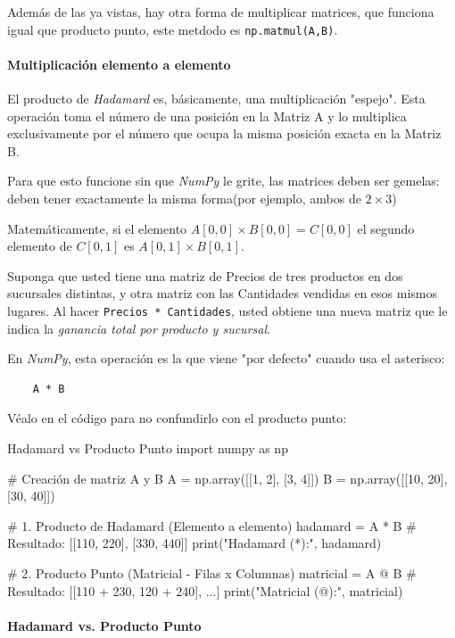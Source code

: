 Además de las ya vistas, hay otra forma de multiplicar matrices, que funciona igual que producto punto, este metdodo es \texttt{np.matmul(A,B)}.

\paragraph{Multiplicación elemento a elemento}
El producto de \textit{Hadamard} es, básicamente, una multiplicación "espejo". Esta operación toma el número de una posición en la Matriz A y lo multiplica exclusivamente por el número que ocupa la misma posición exacta en la Matriz B.

Para que esto funcione sin que \textit{NumPy} le grite, las matrices deben ser gemelas: deben tener exactamente la misma forma(por ejemplo, ambos de \(2 \times 3\))

Matemáticamente, si el elemento \(A[0,0] \times B[0,0] = C[0,0]\) el segundo elemento de \(C[0,1]\) es \(A[0,1] \times B[0,1]\).

\begin{ejemplo}
    Suponga que usted tiene una matriz de Precios de tres productos en dos sucursales distintas, y otra matriz con las Cantidades vendidas en esos mismos lugares. Al hacer \texttt{Precios * Cantidades}, usted obtiene una nueva matriz que le indica la \textit{ganancia total por producto y sucursal}.
\end{ejemplo}

En \textit{NumPy}, esta operación es la que viene "por defecto" cuando usa el asterisco:
\begin{verbatim}
    A * B
\end{verbatim}

Véalo en el código para no confundirlo con el producto punto:

\begin{pycode}{Hadamard vs Producto Punto}
import numpy as np

# Creación de matriz A y B
A = np.array([[1, 2], [3, 4]])
B = np.array([[10, 20], [30, 40]])

# 1. Producto de Hadamard (Elemento a elemento)
hadamard = A * B # Resultado: [[110, 220], [330, 440]]
print("Hadamard (*):\n", hadamard)


# 2. Producto Punto (Matricial - Filas x Columnas)
matricial = A @ B # Resultado: [[110 + 230, 120 + 240], ...]
print("Matricial (@):\n", matricial)
\end{pycode}

\paragraph{Hadamard vs. Producto Punto}

